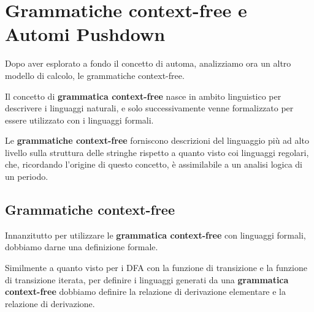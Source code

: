 \chapter{Grammatiche context-free e Automi Pushdown}

Dopo aver esplorato a fondo il concetto di automa, analizziamo ora un altro modello di calcolo, le grammatiche context-free.

Il concetto di \textbf{grammatica context-free} nasce in ambito linguistico per descrivere i linguaggi naturali, e solo successivamente venne formalizzato per essere utilizzato con i linguaggi formali.

Le \textbf{grammatiche context-free} forniscono descrizioni del linguaggio più ad alto livello sulla struttura delle stringhe rispetto a quanto visto coi linguaggi regolari, che, ricordando l'origine di questo concetto, è assimilabile a un analisi logica di un periodo.

\section{Grammatiche context-free}

Innanzitutto per utilizzare le \textbf{grammatica context-free} con linguaggi formali, dobbiamo darne una definizione formale.


Similmente a quanto visto per i DFA con la funzione di transizione e la funzione di transizione iterata, per definire i linguaggi generati da una \textbf{grammatica context-free} dobbiamo definire la relazione di derivazione elementare e la relazione di derivazione.

